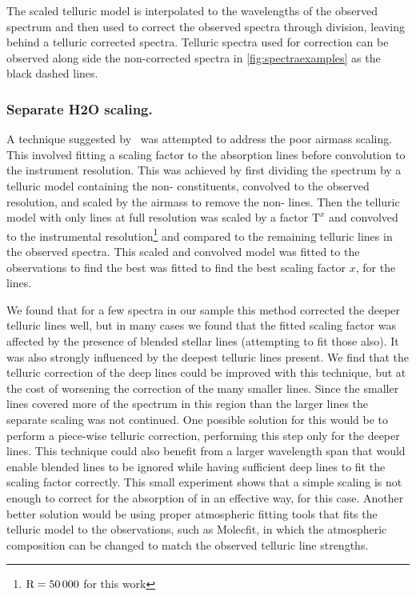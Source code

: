The scaled telluric model is interpolated to the wavelengths of the observed spectrum and then used to correct the observed spectra through division, leaving behind a telluric corrected spectra.
Telluric spectra used for correction can be observed along side the non-corrected spectra in \cref{fig:spectraexamples} as the black dashed lines. 

\subsubsection{Separate \si{H2O} scaling.}
A technique suggested by~\citet{bertaux_tapas_2014} was attempted to address the poor  airmass scaling.
This involved fitting a scaling factor to the   absorption lines before convolution to the instrument resolution.
This was achieved by first dividing the spectrum by a telluric model containing the non- constituents, convolved to the observed resolution, and scaled by the airmass to remove the non- lines.
Then the telluric model with only  lines at full resolution was scaled by a factor \(\textrm{T}^{x}\) and convolved to the instrumental resolution\footnote{\(\rm R=50\,000\) for this work} and compared to the remaining telluric lines in the observed spectra.
This scaled and convolved model was fitted to the observations to find the best was fitted to find the best scaling factor \(x\),  for the  lines.

We found that for a few spectra in our sample this method corrected the deeper telluric lines well, but in many cases we found that the fitted scaling factor was affected by the presence of blended stellar lines (attempting to fit those also).
It was also strongly influenced by the deepest   telluric lines present.
We find that the telluric correction of the deep  lines could be improved with this technique, but at the cost of worsening the correction of the many smaller  lines.
Since the smaller  lines covered more of the spectrum in this region than the larger lines the separate  scaling was not continued.
One possible solution for this would be to perform a piece-wise telluric correction, performing this step only for the deeper  lines. 
This technique could also benefit from a larger wavelength span that would enable blended lines to be ignored while having sufficient deep  lines to fit the scaling factor correctly.
This small experiment shows that a simple scaling is not enough to correct for the absorption of  in an effective way, for this case. 
Another better solution would be using proper atmospheric fitting tools that fits the telluric model to the observations, such as {Molecfit}, in which the atmospheric composition can be changed to match the observed telluric line strengths.


